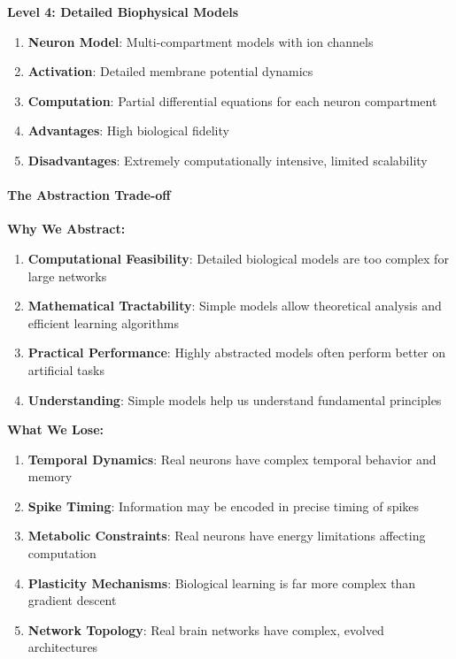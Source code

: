 \textbf{Level 4: Detailed Biophysical Models}

\begin{enumerate}
\item \textbf{Neuron Model}: Multi-compartment models with ion channels
\item \textbf{Activation}: Detailed membrane potential dynamics
\item \textbf{Computation}: Partial differential equations for each neuron compartment
\item \textbf{Advantages}: High biological fidelity
\item \textbf{Disadvantages}: Extremely computationally intensive, limited scalability
\end{enumerate}

\paragraph{The Abstraction Trade-off}
\label{para:abstraction-tradeoff}

\textbf{Why We Abstract:}

\begin{enumerate}
\item \textbf{Computational Feasibility}: Detailed biological models are too complex for large networks
\item \textbf{Mathematical Tractability}: Simple models allow theoretical analysis and efficient learning algorithms
\item \textbf{Practical Performance}: Highly abstracted models often perform better on artificial tasks
\item \textbf{Understanding}: Simple models help us understand fundamental principles
\end{enumerate}

\textbf{What We Lose:}

\begin{enumerate}
\item \textbf{Temporal Dynamics}: Real neurons have complex temporal behavior and memory
\item \textbf{Spike Timing}: Information may be encoded in precise timing of spikes
\item \textbf{Metabolic Constraints}: Real neurons have energy limitations affecting computation
\item \textbf{Plasticity Mechanisms}: Biological learning is far more complex than gradient descent
\item \textbf{Network Topology}: Real brain networks have complex, evolved architectures
\end{enumerate}

